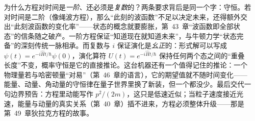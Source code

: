 \begin{challenge}
为什么方程对时间是\emph{一阶}、还必须是\emph{复数}的？两条要求背后是同一个字：守恒。若对时间是二阶（像绳波方程），那么“此刻的波函数”不足以决定未来，还得额外交出“此刻波函数的变化率”——状态的概念就要膨胀，第~43~章“波函数即全部状态”的信条随之破产。一阶方程保证“知道现在就知道未来”，与牛顿力学“状态完备”的深刻传统一脉相承。而复数与 \(i\) 保证演化是\emph{幺正}的：形式解可以写成 \(\psi(t)=e^{-i\hat{H}t/\hbar}\psi(0)\)，演化算符 \(U(t)=e^{-i\hat{H}t/\hbar}\) 保持任何两个态之间的“重叠长度”不变，概率守恒是它的直接推论。这台机器还有一个值得记住的推论：一个物理量若与哈密顿量“对易”（第~46~章的语言），它的期望值就不随时间变化——能量、动量、角动量的守恒律在量子世界里换了新装，但一个都没少。最后交代一句边界预告：方程里动能写作 \(p^{2}/(2m)\)，这只是低速近似；当粒子速度接近光速，能量与动量的真实关系（第~40~章）插不进来，方程必须整体升级——那是第~49~章狄拉克方程的故事。
\end{challenge}


